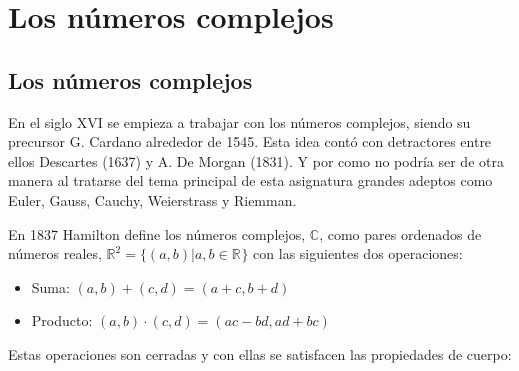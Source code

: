 \chapter{Los números complejos}

\section{Los números complejos}
En el siglo XVI se empieza a trabajar con los números complejos, siendo su precursor G. Cardano alrededor de 1545.
Esta idea contó con detractores entre ellos Descartes (1637) y A. De Morgan (1831).
Y por como no podría ser de otra manera al tratarse del tema principal de esta asignatura grandes adeptos como Euler, Gauss, Cauchy, Weierstrass y Riemman.

En 1837 Hamilton define los números complejos, \(\mathbb{C}\), como pares ordenados de números reales, \(\mathbb{R}^{2}=\{(a,b) | a,b \in \mathbb{R}^{}\}\) con las siguientes dos operaciones:

\begin{itemize}
  \item Suma: \((a,b)+(c,d) = (a+c, b+d)\)
  \item Producto: \((a,b)\cdot(c,d) = (ac-bd, ad+bc)\)
\end{itemize}

Estas operaciones son cerradas y con ellas se satisfacen las propiedades de cuerpo:


